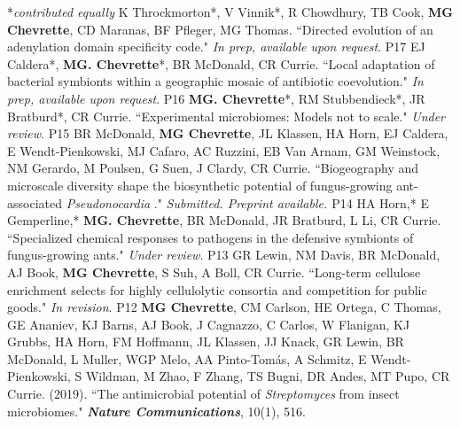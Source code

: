 


\begin{cvpubs}
  \cvpub
    {\hspace{-1cm} *\textit{contributed equally}} %
    {} %
   \cvpub
    {K Throckmorton*, V Vinnik*, R Chowdhury, TB Cook, \textbf{MG Chevrette}, CD Maranas, BF Pfleger, MG Thomas. ``Directed evolution of an adenylation domain specificity code." \textit{In prep, available upon request}.
    } %
    {P17}
   \cvpub
    {EJ Caldera*, \textbf{MG. Chevrette}*, BR McDonald, CR Currie. ``Local adaptation of bacterial symbionts within a geographic mosaic of antibiotic coevolution." \textit{In prep, available upon request}.
    } %
    {P16}
   \cvpub
    {\textbf{MG. Chevrette}*, RM Stubbendieck*, JR Bratburd*, CR Currie. ``Experimental microbiomes: Models not to scale." \textit{Under review}.
    } %
    {P15} %
   \cvpub
    {BR McDonald, \textbf{MG Chevrette}, JL Klassen, HA Horn, EJ Caldera, E Wendt-Pienkowski, MJ Cafaro, AC Ruzzini, EB Van Arnam, GM Weinstock, NM Gerardo, M Poulsen, G Suen, J Clardy, CR Currie. ``Biogeography and microscale diversity shape the biosynthetic potential of fungus-growing ant-associated \textit{Pseudonocardia}
." \textit{Submitted. Preprint available. \textbf{}}
    } %
    {P14} %
  \cvpub
    {HA Horn,* E Gemperline,* \textbf{MG. Chevrette}, BR McDonald, JR Bratburd, L Li, CR Currie. ``Specialized chemical responses to pathogens in the defensive symbionts of fungus-growing ants." \textit{Under review}.
    } %
    {P13} %
  \cvpub
    {GR Lewin, NM Davis, BR McDonald, AJ Book, \textbf{MG Chevrette}, S Suh, A Boll, CR Currie. ``Long-term cellulose enrichment selects for highly cellulolytic consortia and competition for public goods." \textit{In revision}.
    } %
    {P12} %
  \cvpub
    {\textbf{MG Chevrette}, CM Carlson, HE Ortega, C Thomas, GE Ananiev, KJ Barns, AJ Book, J Cagnazzo, C Carlos, W Flanigan, KJ Grubbs, HA Horn, FM Hoffmann, JL Klassen, JJ Knack, GR Lewin, BR McDonald, L Muller, WGP Melo, AA Pinto-Tom\'{a}s, A Schmitz, E Wendt-Pienkowski, S Wildman, M Zhao, F Zhang, TS Bugni, DR Andes, MT Pupo, CR Currie. (2019). ``The antimicrobial potential of \textit{Streptomyces} from insect microbiomes." \textit{\textbf{Nature Communications}}, 10(1), 516. \textbf{\textit{}}
}
\end{cvpubs}
